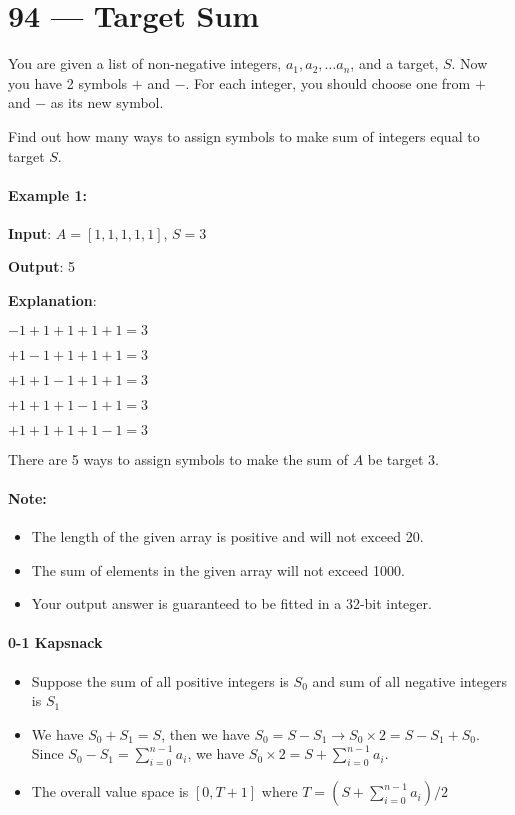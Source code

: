 \section{94 --- Target Sum}
You are given a list of non-negative integers, $a_1, a_2, \ldots a_n$, and a target, $S$. Now you have 2 symbols $+$ and $-$. For each integer, you should choose one from $+$ and $-$ as its new symbol.

Find out how many ways to assign symbols to make sum of integers equal to target $S$.

\paragraph{Example 1:}

\begin{flushleft}
\textbf{Input}: $A = [1, 1, 1, 1, 1]$, $S = 3$
 
\textbf{Output}: 5

\textbf{Explanation}: 

$-1+1+1+1+1 = 3$

$+1-1+1+1+1 = 3$

$+1+1-1+1+1 = 3$

$+1+1+1-1+1 = 3$

$+1+1+1+1-1 = 3$


\end{flushleft}

There are 5 ways to assign symbols to make the sum of $A$ be target 3.

\paragraph{Note:}
\begin{itemize}
\item The length of the given array is positive and will not exceed 20.
\item The sum of elements in the given array will not exceed 1000.
\item Your output answer is guaranteed to be fitted in a 32-bit integer.
\end{itemize}

\paragraph{0-1 Kapsnack}
\begin{itemize}
\item Suppose the sum of all positive integers is $S_0$ and sum of all negative integers is $S_1$
\item We have $S_0 + S_1=S$, then we have $S_0 = S- S_1 \to S_0 \times 2 = S - S_1+S_0$. Since $S_0-S_1=\sum\limits_{i=0}^{n-1}a_i$, we have $S_0\times 2 = S + \sum\limits_{i=0}^{n-1}a_i$.
\item The overall value space is $[0, T+1]$ where $T = (S+\sum\limits_{i=0}^{n-1}a_i) / 2$
\end{itemize}

